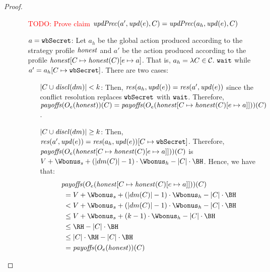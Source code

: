 \begin{proof}
\begin{itemize}
\begin{itemize}
\begin{itemize}
\end{itemize}

\textcolor{red}{TODO: Prove claim $ \updPrec{a'}{\update{e}}{C} =  \updPrec{a_h}{\update{e}}{C}$}

\item[$a = \wSecret$:]
%
Let $a_h$ be the global action produced according to the strategy profile $\honest$ and $a'$ be the action produced according to the profile $\honest[C \mapsto \honest(C)[e \mapsto a]$.
%
That is, $a_h = \lambda C \in \coalitionSchema.\ \wait$ while $a'= a_h[C \mapsto \wSecret]$.
%
There are two cases:
\begin{itemize}
\item[$|C \cup \disclosed{dm}| < k$:]
%
Then, $\conflictAction{a_h}{\update{e}} = \conflictAction{a'}{\update{e}}$ since the conflict resolution replaces $\wSecret$ with $\wait$.
%
Therefore, $\payoffs(\subgameOutcome{\honest}{e})(C) = \payoffs(\subgameOutcome{\honest[C \mapsto \honest(C)[e \mapsto a]]}{e})(C)$.


\item[$|C \cup \disclosed{dm}| \geq k$:]	
%
Then, $\conflictAction{a'}{\update{e}} = \conflictAction{a_h}{\update{e}}[C \mapsto \wSecret]$.
%
Therefore,  $\payoffs(\subgameOutcome{\honest[C \mapsto \honest(C)[e \mapsto a]]}{e})(C)$ is $V + \Wbonus_s + (|dm(C)| -1) \cdot \Wbonus_h - |C| \cdot \BH$.
%
Hence, we have that:
	\begin{align*}
			&\payoffs(\subgameOutcome{\honest[C \mapsto \honest(C)[e \mapsto a]]}{e})(C) \\
			&\ = V + \Wbonus_s + (|dm(C)| -1) \cdot \Wbonus_h - |C| \cdot \BH \\  
			&\ <  V + \Wbonus_s + (|dm(C)| -1) \cdot \Wbonus_h - |C| \cdot \BH \\	%
			&\ \leq  V + \Wbonus_s + (k -1) \cdot \Wbonus_h - |C| \cdot \BH \\ %
			&\ \leq  \RH - |C| \cdot \BH \\ %
			&\ \leq |C|  \cdot \RH - |C| \cdot \BH \\ %
			&\ = \payoffs(\subgameOutcome{\honest}{e})(C) %
	\end{align*}
\end{itemize}
\end{itemize}
\end{itemize}
\end{proof}

